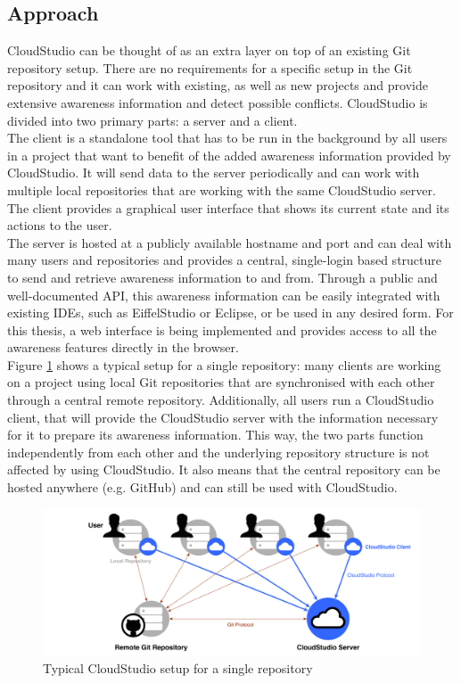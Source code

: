 \subsection{Approach}\label{designapproach}


CloudStudio can be thought of as an extra layer on top of an existing Git repository setup. There are no requirements for a specific setup in the Git repository and it can work with existing, as well as new projects and provide extensive awareness information and detect possible conflicts. CloudStudio is divided into two primary parts: a server and a client. \\

The client is a standalone tool that has to be run in the background by all users in a project that want to benefit of the added awareness information provided by CloudStudio. It will send data to the server periodically and can work with multiple local repositories that are working with the same CloudStudio server. The client provides a graphical user interface that shows its current state and its actions to the user. \\

The server is hosted at a publicly available hostname and port and can deal with many users and repositories and provides a central, single-login based structure to send and retrieve awareness information to and from. Through a public and well-documented API, this awareness information can be easily integrated with existing IDEs, such as EiffelStudio \cite{eiffelstudio} or Eclipse, or be used in any desired form. For this thesis, a web interface is being implemented and provides access to all the awareness features directly in the browser. \\

Figure \ref{fig:generalsetup} shows a typical setup for a single repository: many clients are working on a project using local Git repositories that are synchronised with each other through a central remote repository. Additionally, all users run a CloudStudio client, that will provide the CloudStudio server with the information necessary for it to prepare its awareness information. This way, the two parts function independently from each other and the underlying repository structure is not affected by using CloudStudio. It also means that the central repository can be hosted anywhere (e.g. GitHub) and can still be used with CloudStudio. \\

\begin{figure}[h!]
  \centering
      \includegraphics[width=1\textwidth]{overallsetup2}
  \caption{Typical CloudStudio setup for a single repository}
  \label{fig:generalsetup}
\end{figure}

